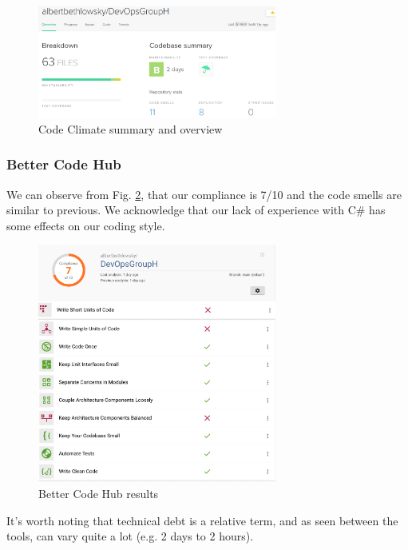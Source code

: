 \documentclass{article}
\begin{document}
\begin{figure}[H]
\centering
\includegraphics[width=0.7\textwidth]{images/codeclimate.png}
\caption{\label{fig:clim} Code Climate summary and overview}
\end{figure}

\subsubsection*{Better Code Hub}
We can observe from Fig. \ref{fig:code}, that our compliance is 7/10 and the code smells are similar to previous. We acknowledge that our lack of experience with C\# has some effects on our coding style. 

\begin{figure}[H]
\centering
\includegraphics[width=0.7\textwidth]{images/bch.png}
\caption{\label{fig:code} Better Code Hub results}
\end{figure}

It's worth noting that technical debt is a relative term, and as seen between the tools, can vary quite a lot (e.g. 2 days to 2 hours).
\end{document}
